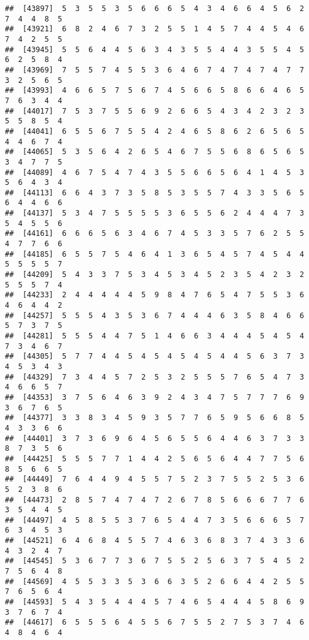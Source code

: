 \documentclass[
]{book}
\begin{document}
\begin{verbatim}
##  [43897]  5  3  5  5  3  5  6  6  6  5  4  3  4  6  6  4  5  6  2  7  4  4  8  5
##  [43921]  6  8  2  4  6  7  3  2  5  5  1  4  5  7  4  4  5  4  6  7  4  2  5  5
##  [43945]  5  5  6  4  4  5  6  3  4  3  5  5  4  4  3  5  5  4  5  6  2  5  8  4
##  [43969]  7  5  5  7  4  5  5  3  6  4  6  7  4  7  4  7  4  7  7  3  2  5  6  5
##  [43993]  4  6  6  5  7  5  6  7  4  5  6  6  5  8  6  6  4  6  5  7  6  3  4  4
##  [44017]  7  5  3  7  5  5  6  9  2  6  6  5  4  3  4  2  3  2  3  5  5  8  5  4
##  [44041]  6  5  5  6  7  5  5  4  2  4  6  5  8  6  2  6  5  6  5  4  4  6  7  4
##  [44065]  5  3  5  6  4  2  6  5  4  6  7  5  5  6  8  6  5  6  5  3  4  7  7  5
##  [44089]  4  6  7  5  4  7  4  3  5  5  6  6  5  6  4  1  4  5  3  5  6  4  3  4
##  [44113]  6  6  4  3  7  3  5  8  5  3  5  5  7  4  3  3  5  6  5  6  4  4  6  6
##  [44137]  5  3  4  7  5  5  5  5  3  6  5  5  6  2  4  4  4  7  3  5  4  5  5  6
##  [44161]  6  6  6  5  6  3  4  6  7  4  5  3  3  5  7  6  2  5  5  4  7  7  6  6
##  [44185]  6  5  5  7  5  4  6  4  1  3  6  5  4  5  7  4  5  4  4  5  5  5  5  7
##  [44209]  5  4  3  3  7  5  3  4  5  3  4  5  2  3  5  4  2  3  2  5  5  5  7  4
##  [44233]  2  4  4  4  4  4  5  9  8  4  7  6  5  4  7  5  5  3  6  4  6  4  4  2
##  [44257]  5  5  5  4  3  5  3  6  7  4  4  4  6  3  5  8  4  6  6  5  7  3  7  5
##  [44281]  5  5  5  4  4  7  5  1  4  6  6  3  4  4  4  5  4  5  4  7  3  4  6  7
##  [44305]  5  7  7  4  4  5  4  5  4  5  4  5  4  4  5  6  3  7  3  4  5  3  4  3
##  [44329]  7  3  4  4  5  7  2  5  3  2  5  5  5  7  6  5  4  7  3  4  6  6  5  7
##  [44353]  3  7  5  6  4  6  3  9  2  4  3  4  7  5  7  7  7  6  9  3  6  7  6  5
##  [44377]  3  3  8  3  4  5  9  3  5  7  7  6  5  9  5  6  6  8  5  4  3  3  6  6
##  [44401]  3  7  3  6  9  6  4  5  6  5  5  6  4  4  6  3  7  3  3  8  7  3  5  6
##  [44425]  5  5  5  7  7  1  4  4  2  5  6  5  6  4  4  7  7  5  6  8  5  6  6  5
##  [44449]  7  6  4  4  9  4  5  5  7  5  2  3  7  5  5  2  5  3  6  5  2  3  8  6
##  [44473]  2  8  5  7  4  7  4  7  2  6  7  8  5  6  6  6  7  7  6  3  5  4  4  5
##  [44497]  4  5  8  5  5  3  7  6  5  4  4  7  3  5  6  6  6  5  7  6  3  4  5  3
##  [44521]  6  4  6  8  4  5  5  7  4  6  3  6  8  3  7  4  3  3  6  4  3  2  4  7
##  [44545]  5  3  6  7  7  3  6  7  5  5  2  5  6  3  7  5  4  5  2  7  5  6  4  8
##  [44569]  4  5  5  3  3  5  3  6  6  3  5  2  6  6  4  4  2  5  5  7  6  5  6  4
##  [44593]  5  4  3  5  4  4  4  5  7  4  6  5  4  4  4  5  8  6  9  3  7  6  7  4
##  [44617]  6  5  5  5  6  4  5  5  6  7  5  5  2  7  5  3  7  4  6  4  8  4  6  4

\end{verbatim}
\end{document}
